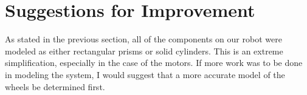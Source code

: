 \documentclass{article}
\begin{document}
\newpage
\section{Suggestions for Improvement}
As stated in the previous section, all of the components on our robot were modeled as either rectangular prisms or solid cylinders.  This is an extreme simplification, especially in the case of the motors.  If more work was to be done in modeling the system, I would suggest that a more accurate model of the wheels be determined first.
\end{document}
